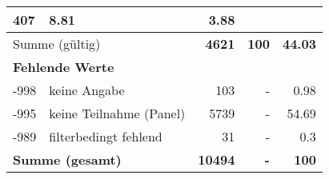 \begin{longtable}{lXrrr}
       \num{407} &
       \num[round-mode=places,round-precision=2]{8,81} &
         \num[round-mode=places,round-precision=2]{3,88} \\
     \midrule
     \multicolumn{2}{l}{Summe (gültig)} &
       \textbf{\num{4621}} &
     \textbf{100} &
       \textbf{\num[round-mode=places,round-precision=2]{44,03}} \\
     \multicolumn{5}{l}{\textbf{Fehlende Werte}}\\
       -998 &
       keine Angabe &
         \num{103} &
        - &
         \num[round-mode=places,round-precision=2]{0,98} \\
       -995 &
       keine Teilnahme (Panel) &
         \num{5739} &
        - &
         \num[round-mode=places,round-precision=2]{54,69} \\
       -989 &
       filterbedingt fehlend &
         \num{31} &
        - &
         \num[round-mode=places,round-precision=2]{0,3} \\
     \midrule
     \multicolumn{2}{l}{\textbf{Summe (gesamt)}} &
          \textbf{\num{10494}} &
        \textbf{-} &
        \textbf{100} \\
     \bottomrule
     \end{longtable}
     
